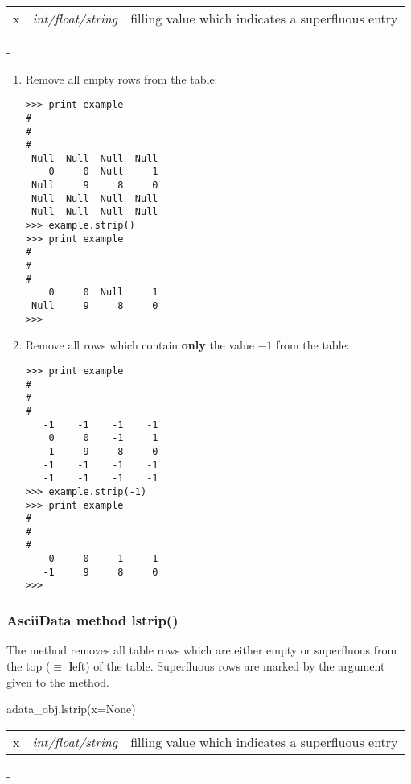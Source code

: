 \begin{tabular}{lcl}
x &{\it int/float/string}& filling value which indicates a superfluous entry\\
\end{tabular}

-

\begin{enumerate}
\item Remove all empty rows from the table:
\begin{verbatim}
>>> print example
#
#
#
 Null  Null  Null  Null
    0     0  Null     1
 Null     9     8     0
 Null  Null  Null  Null
 Null  Null  Null  Null
>>> example.strip()
>>> print example
#
#
#
    0     0  Null     1
 Null     9     8     0
>>>
\end{verbatim}
\item Remove all rows which contain {\bf only} the value $-1$ from the table:
\begin{verbatim}
>>> print example
#
#
#
   -1    -1    -1    -1
    0     0    -1     1
   -1     9     8     0
   -1    -1    -1    -1
   -1    -1    -1    -1
>>> example.strip(-1)
>>> print example
#
#
#
    0     0    -1     1
   -1     9     8     0
>>>
\end{verbatim}
\end{enumerate}


\subsubsection{AsciiData method lstrip()}
\label{adm_lstrip}
The method removes all table rows which are either empty or superfluous
from the top ($\equiv$ {\bf l}eft) of the table. Superfluous
rows are marked by the argument given to the method.

adata\_obj.lstrip(x=None)

\begin{tabular}{lcl}
x &{\it int/float/string}& filling value which indicates a superfluous entry\\
\end{tabular}

-

